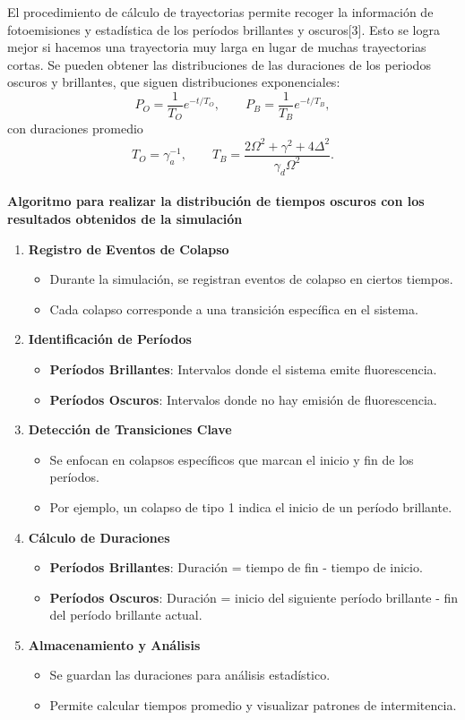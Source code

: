 \documentclass[12pt]{report}
\begin{document}
El procedimiento de c\'alculo de trayectorias permite recoger la informaci\'on de fotoemisiones y estad\'istica de los per\'iodos brillantes y oscuros[3]. Esto se logra mejor si hacemos una trayectoria muy larga en lugar de muchas trayectorias cortas. Se pueden obtener las distribuciones de las duraciones de los periodos oscuros y brillantes, que siguen distribuciones exponenciales: 
$$ P_O = \frac{1}{T_O} e^{-t/T_O}, \qquad  
    P_B = \frac{1}{T_B} e^{-t/T_B} ,$$
con duraciones promedio
$$ T_O = \gamma_a^{-1}, \qquad T_B = \frac{2\Omega^2 + \gamma^2 + 4\Delta^2}{\gamma_d \Omega^2} .$$
\\
\textbf{Algoritmo para realizar la distribución de tiempos oscuros con los resultados obtenidos de la simulación}
\begin{enumerate} \item \textbf{Registro de Eventos de Colapso} \begin{itemize} \item Durante la simulación, se registran eventos de colapso en ciertos tiempos. \item Cada colapso corresponde a una transición específica en el sistema. \end{itemize} \vspace{0.5em} \item \textbf{Identificación de Períodos} \begin{itemize} \item \textbf{Períodos Brillantes}: Intervalos donde el sistema emite fluorescencia. \item \textbf{Períodos Oscuros}: Intervalos donde no hay emisión de fluorescencia. \end{itemize} \vspace{0.5em} \item \textbf{Detección de Transiciones Clave} \begin{itemize} \item Se enfocan en colapsos específicos que marcan el inicio y fin de los períodos. \item Por ejemplo, un colapso de tipo 1 indica el inicio de un período brillante. \end{itemize} \vspace{0.5em} \item \textbf{Cálculo de Duraciones} \begin{itemize} \item \textbf{Períodos Brillantes}: Duración = tiempo de fin - tiempo de inicio. \item \textbf{Períodos Oscuros}: Duración = inicio del siguiente período brillante - fin del período brillante actual. \end{itemize} \vspace{0.5em} \item \textbf{Almacenamiento y Análisis} \begin{itemize} \item Se guardan las duraciones para análisis estadístico. \item Permite calcular tiempos promedio y visualizar patrones de intermitencia. \end{itemize} \end{enumerate}
\end{document}
